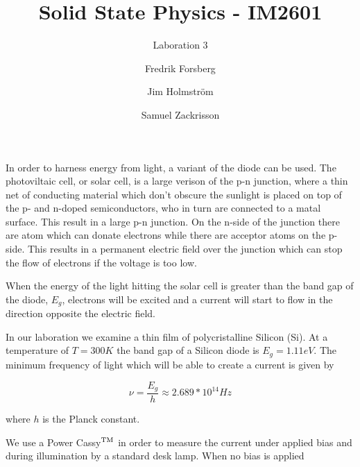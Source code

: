 \documentclass[a4paper,twoside=false,abstract=false,numbers=noenddot,
titlepage=false,headings=small,parskip=half,version=last]{scrartcl}
\title{Solid State Physics - IM2601}
\subtitle{Laboration 3}
\author[1]{Fredrik Forsberg}
\author[1]{Jim Holmström}
\author[1]{Samuel Zackrisson}
\affil[1]{Engineering Physics, Royal Institute of Technology}
\affil[1]{\{fforsber, jimho, samuelz\}@kth.se}
\begin{document}
\maketitle
\thispagestyle{empty}


In order to harness energy from light, a variant of the diode can be used. The photoviltaic cell, or solar cell, is a large verison of the p-n junction, where a thin net of conducting material which don't obscure the sunlight is placed on top of the p- and n-doped semiconductors, who in turn are connected to a matal surface. This result in a large p-n junction. On the n-side of the junction there are atom which can donate electrons while there are acceptor atoms on the p-side. This results in a permanent electric field over the junction which can stop the flow of electrons if the voltage is too low.

When the energy of the light hitting the solar cell is greater than the band gap of the diode, $E_g$, electrons will be excited and a current will start to flow in the direction opposite the electric field.



In our laboration we examine a thin film of polycristalline Silicon (Si). At a temperature of $T = 300 K$ the band gap of a Silicon diode is $E_g=1.11 eV$. The minimum frequency of light which will be able to create a current is given by

$$\nu = \frac{E_g}{h} \approx 2.689*10^{14} Hz$$

where $h$ is the Planck constant.


We use a Power Cassy$\textsuperscript{TM}$ in order to measure the current under applied bias and during illumination by a standard desk lamp. When no bias is applied 
\end{document}
